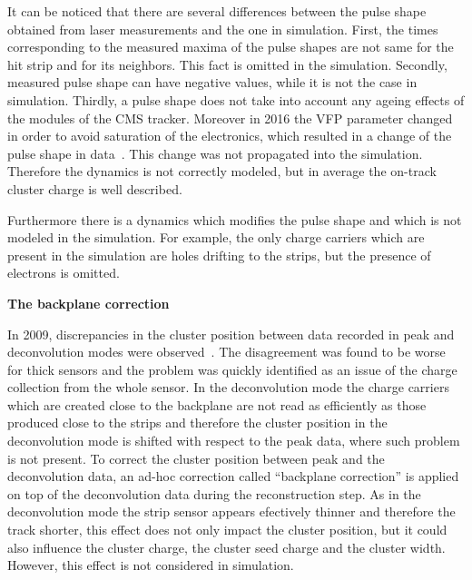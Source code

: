 It can be noticed that there are several differences between the pulse shape obtained from laser measurements and the one in simulation. First, the times corresponding to the measured maxima of the pulse shapes are not same for the hit strip and for its neighbors. This fact is omitted in the simulation. Secondly, measured pulse shape can have negative values, while it is not the case in simulation. Thirdly, a pulse shape does not take into account any ageing effects of the modules of the CMS tracker. Moreover in 2016 the VFP parameter changed in order to avoid saturation of the electronics, which resulted in a change of the pulse shape in data~\cite{website:vfp}. This change was not propagated into the simulation. Therefore the dynamics is not correctly modeled, but in average the on-track cluster charge is well described. 

Furthermore there is a dynamics which modifies the pulse shape and which is not modeled in the simulation. For example, the only charge carriers which are present in the simulation are holes drifting to the strips, but the presence of electrons is omitted.

\textbf{The backplane correction}

In 2009, discrepancies in the cluster position between data recorded in peak and deconvolution modes were observed~\cite{website:backplane}. The disagreement was found to be worse for thick sensors and the problem was quickly identified as an issue of the charge collection from the whole sensor. In the deconvolution mode the charge carriers which are created close to the backplane are not read as efficiently as those produced close to the strips and therefore the cluster position in the deconvolution mode is shifted with respect to the peak data, where such problem is not present. To correct the cluster position between peak and the deconvolution data, an ad-hoc correction called ``backplane correction'' is applied on top of the deconvolution data during the reconstruction step. As in the deconvolution mode the strip sensor appears efectively thinner and therefore the track shorter, this effect does not only impact the cluster position, but it could also influence the cluster charge, the cluster seed charge and the cluster width. However, this effect is not considered in simulation.




